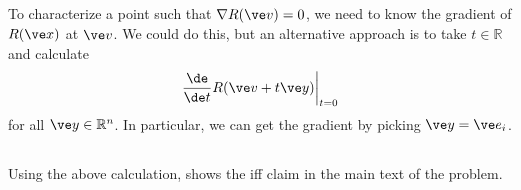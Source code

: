 \documentclass[11pt,letterpaper]{article}
\begin{document}
\subsection{}
To characterize a point such that $\nabla R(\ve v) = 0$, we need to know the gradient of $R(\ve x)$ at $\ve v$. We could do this, but an alternative approach is to take $t\in \mathbb{R}$ and calculate
\begin{align*}
    \left.\frac{\de}{\de t} R(\ve v+t\ve y)\right|_{t=0}
\end{align*}
for all $\ve y\in\mathbb{R}^n$. In particular, we can get the gradient by picking $\ve y = \ve e_i$.

\subsection{}
Using the above calculation, shows the iff claim in the main text of the problem.


\vfill


\end{document}

